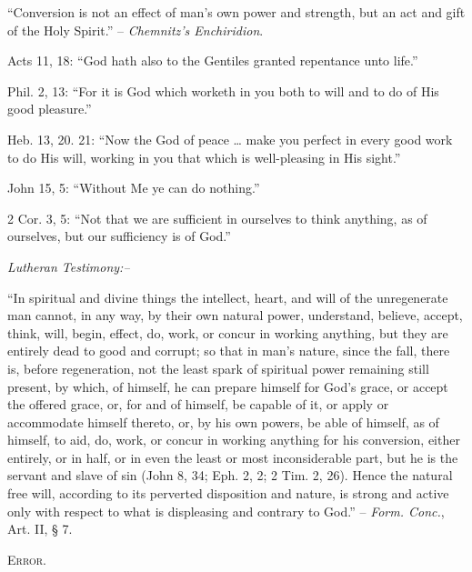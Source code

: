 \documentclass[
]{book}
\begin{document}
``Conversion is not an effect of man's own power and strength, but an act and gift of the Holy Spirit.'' -- \emph{Chemnitz's Enchiridion}.

Acts 11, 18: ``God hath also to the Gentiles granted repentance unto life.''

Phil. 2, 13: ``For it is God which worketh in you both to will and to do of His good pleasure.''

Heb. 13, 20. 21: ``Now the God of peace \ldots{} make you perfect in every good work to do His will, working in you that which is well-pleasing in His sight.''

John 15, 5: ``Without Me ye can do nothing.''

2 Cor. 3, 5: ``Not that we are sufficient in ourselves to think anything, as of ourselves, but our sufficiency is of God.''

\begin{center}
\textsl{Lutheran Testimony:--}
\end{center}

``In spiritual and divine things the intellect, heart, and will of the unregenerate man cannot, in any way, by their own natural power, understand, believe, accept, think, will, begin, effect, do, work, or concur in working anything, but they are entirely dead to good and corrupt; so that in man's nature, since the fall, there is, before regeneration, not the least spark of spiritual power remaining still present, by which, of himself, he can prepare himself for God's grace, or accept the offered grace, or, for and of himself, be capable of it, or apply or accommodate himself thereto, or, by his own powers, be able of himself, as of himself, to aid, do, work, or concur in working anything for his conversion, either entirely, or in half, or in even the least or most inconsiderable part, but he is the servant and slave of sin (John 8, 34; Eph. 2, 2; 2 Tim. 2, 26). Hence the natural free will, according to its perverted disposition and nature, is strong and active only with respect to what is displeasing and contrary to God.'' -- \emph{Form. Conc.}, Art. II, § 7.

\begin{center}
\textsc{Error.}
\end{center}
\end{document}
